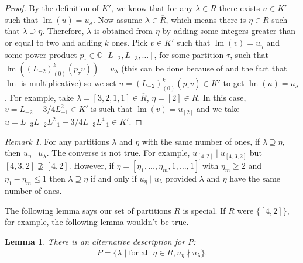 \documentclass[a4paper, 12pt, reqno]{amsart}
\newtheorem{lemma}[theorem]{Lemma}
\theoremstyle{remark}
\newtheorem{remark}[theorem]{Remark}
\numberwithin{equation}{subsection}
\DeclareMathOperator{\lm}{lm}
\begin{document}
\begin{proof}
  By the definition of $K'$, we know that for any $\lambda \in R$ there exists $u \in K'$ such that $\lm(u) = u_\lambda$.
  Now assume $\lambda \in \overline{R}$, which means there is $\eta \in R$ such that $\lambda \supseteq \eta$.
  Therefore, $\lambda$ is obtained from $\eta$ by adding some integers greater than or equal to two and adding $k$ ones.
  Pick $v \in K'$ such that $\lm(v) = u_\eta$ and some power product $p_\tau \in \mathbb{C}[L_{-2}, L_{-3}, \dots]$, for some partition $\tau$, such that $\lm((L_{-2})^k_{(0)}(p_\tau v)) = u_\lambda$ (this can be done because of  and the fact that $\lm$ is multiplicative) so we set $u = (L_{-2})^k_{(0)}(p_\tau v) \in K'$ to get $\lm(u) = u_\lambda$.
  For example, take $\lambda = [3, 2, 1, 1] \in \overline{R}$, $\eta = [2] \in R$.
  In this case, $v = L_{-2}- 3/4L_{-1}^2 \in K'$ is such that $\lm(v) = u_{[2]}$ and we take $u = L_{-3}L_{-2}L_{-1}^2 - 3/4L_{-3}L_{-1}^4 \in K'$.
\end{proof}

\begin{remark}
  \label{rmk:39}
  For any partitions $\lambda$ and $\eta$ with the same number of ones, if $\lambda \supseteq \eta$, then $u_\eta \mid u_{\lambda}$.
  The converse is not true.
  For example, $u_{[4, 2]} \mid u_{[4, 3, 2]}$ but $[4, 3, 2] \nsupseteq [4, 2]$.
  However, if $\eta = [\eta_1, \dots, \eta_m, 1, \dots, 1]$ with $\eta_m \ge 2$ and $\eta_1 - \eta_m \le 1$ then $\lambda \supseteq \eta$ if and only if $u_{\eta} \mid u_{\lambda}$ provided $\lambda$ and $\eta$ have the same number of ones.
\end{remark}

The following lemma says our set of partitions $R$ is special.
If $R$ were $\{[4, 2]\}$, for example, the following lemma wouldn't be true.

\begin{lemma}
  \label{lmm:31}
  There is an alternative description for $P$:
  \begin{equation*}
    P = \{\lambda \mid \text{for all }\eta \in \overline{R}, u_\eta \nmid u_\lambda\}.
  \end{equation*}
\end{lemma}
\end{document}
